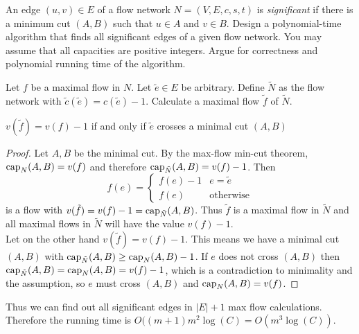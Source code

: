 \documentclass{article}
\begin{document}
\begin{exercise}
    An edge $(u,v)\in E$ of a flow network $N= (V,E,c,s,t)$ is \textit{significant} if there is a minimum cut $(A,B)$ such that $u\in A$ and $v\in B$. Design a polynomial-time algorithm that finds all significant edges of a given flow network. You may assume that all capacities are positive integers. Argue for correctness and polynomial running time of the algorithm. 
\end{exercise}
\begin{solving}
Let $f$ be a maximal flow in $N$.
    Let $\tilde e\in E$ be arbitrary. Define $\tilde N$ as the flow network with $\tilde c(\tilde e) = c(\tilde e)-1$. Calculate a maximal flow $\tilde f$ of $\tilde N$.
    \begin{proposition}
        $v(\tilde f) = v(f)-1$ if and only if $\tilde e$ crosses a minimal cut $(A,B)$
    \end{proposition}
    \begin{proof}
        Let $A,B$ be the minimal cut. By the max-flow min-cut theorem, $\mathrm{cap}_N(A,B) = v(f)$ and therefore $\mathrm{cap}_{\tilde N}(A,B) = v(f)-1$. Then $$f(e) = \begin{cases}
            f(e)-1& e = \tilde e\\
            f(e) &\text{otherwise}
        \end{cases}$$ is a flow with $v(\tilde f) = v(f)-1 = \mathrm{cap}_{\tilde N}(A,B)$. Thus $\tilde f$ is a maximal flow in $\tilde N$ and all maximal flows in $\tilde N$ will have the value $v(f)-1$.
        \\
        Let on the other hand $v(\tilde f) = v(f)-1$. This means we have a minimal cut $(A,B)$ with $\mathrm{cap}_{\tilde N}(A,B)\geq \mathrm{cap}_N(A,B)-1$. If $e$ does not cross $(A,B)$ then $\mathrm{cap}_{\tilde N}(A,B)= \mathrm{cap}_N(A,B) = v(f)-1$, which is a contradiction to minimality and the assumption, so $e$ must cross $(A,B)$ and $\mathrm{cap}_N(A,B) = v(f)$.
    \end{proof}
    Thus we can find out all significant edges in $|E|+1$ max flow calculations. Therefore the running time is $O((m+1)m^2\log(C) = O(m^3\log(C))$.
\end{solving}
\newpage
\end{document}
